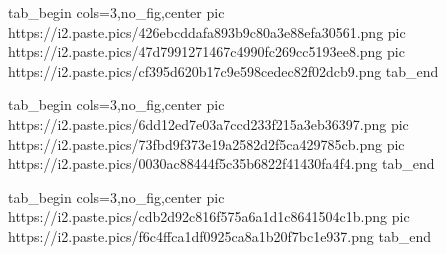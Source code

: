  
 
 
 
 
\qqSecCmtScr

\ifcmt
  tab_begin cols=3,no_fig,center
     pic https://i2.paste.pics/426ebcddafa893b9c80a3e88efa30561.png
     pic https://i2.paste.pics/47d7991271467c4990fc269cc5193ee8.png
     pic https://i2.paste.pics/cf395d620b17c9e598cedec82f02dcb9.png
  tab_end
\fi

\ifcmt
  tab_begin cols=3,no_fig,center
		pic https://i2.paste.pics/6dd12ed7e03a7ccd233f215a3eb36397.png
		pic https://i2.paste.pics/73fbd9f373e19a2582d2f5ca429785cb.png
		pic https://i2.paste.pics/0030ac88444f5c35b6822f41430fa4f4.png
  tab_end
\fi

\ifcmt
  tab_begin cols=3,no_fig,center
		pic https://i2.paste.pics/cdb2d92c816f575a6a1d1c8641504c1b.png
		pic https://i2.paste.pics/f6c4ffca1df0925ca8a1b20f7bc1e937.png
  tab_end
\fi
